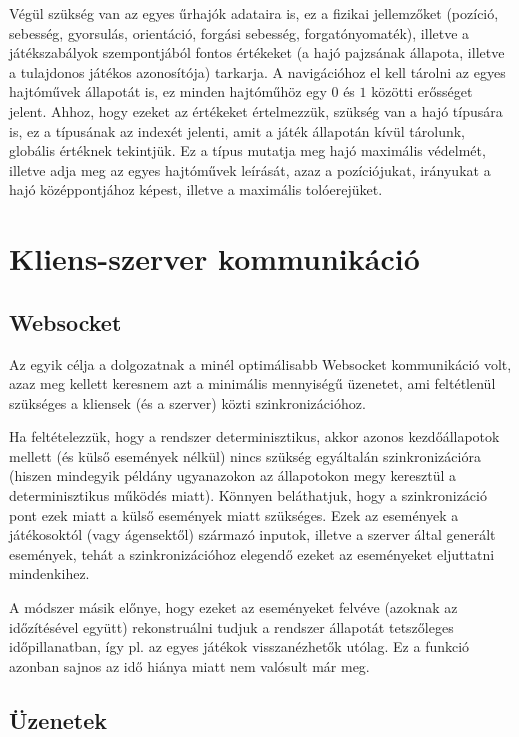 Végül szükség van az egyes űrhajók adataira is, ez a fizikai jellemzőket
(pozíció, sebesség, gyorsulás, orientáció, forgási sebesség, forgatónyomaték),
illetve a játékszabályok szempontjából fontos értékeket (a hajó pajzsának
állapota, illetve a tulajdonos játékos azonosítója) tarkarja. A navigációhoz el
kell tárolni az egyes hajtóművek állapotát is, ez minden hajtóműhöz egy $0$ és
$1$ közötti erősséget jelent. Ahhoz, hogy ezeket az értékeket értelmezzük,
szükség van a hajó típusára is, ez a típusának az indexét jelenti, amit a játék
állapotán kívül tárolunk, globális értéknek tekintjük. Ez a típus mutatja meg
hajó maximális védelmét, illetve adja meg az egyes hajtóművek leírását, azaz a
pozíciójukat, irányukat a hajó középpontjához képest, illetve a maximális
tolóerejüket.

\section{Kliens-szerver kommunikáció}

\subsection{Websocket}

Az egyik célja a dolgozatnak a minél optimálisabb Websocket kommunikáció volt,
azaz meg kellett keresnem azt a minimális mennyiségű üzenetet, ami feltétlenül
szükséges a kliensek (és a szerver) közti szinkronizációhoz.

Ha feltételezzük, hogy a rendszer determinisztikus, akkor azonos kezdőállapotok
mellett (és külső események nélkül) nincs szükség egyáltalán szinkronizációra
(hiszen mindegyik példány ugyanazokon az állapotokon megy keresztül a
determinisztikus működés miatt).
Könnyen beláthatjuk, hogy a szinkronizáció pont ezek miatt a külső események
miatt szükséges. Ezek az események a játékosoktól (vagy ágensektől) származó
inputok, illetve a szerver által generált események, tehát a szinkronizációhoz
elegendő ezeket az eseményeket eljuttatni mindenkihez.

A módszer másik előnye, hogy ezeket az eseményeket felvéve (azoknak az
időzítésével együtt) rekonstruálni tudjuk a rendszer állapotát tetszőleges
időpillanatban, így pl. az egyes játékok visszanézhetők utólag. Ez a funkció
azonban sajnos az idő hiánya miatt nem valósult már meg.

\subsection{Üzenetek}\label{sec:messages}

